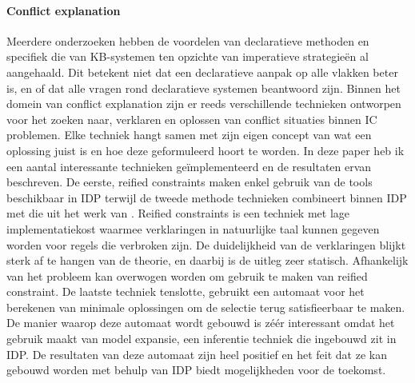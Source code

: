 \paragraph{Conflict explanation}
Meerdere onderzoeken hebben de voordelen van declaratieve methoden \cite{gelle1996interactive} en specifiek die van KB-systemen \cite{de2014predicate} \cite{denecker2008building} \cite{van2016kb} \cite{vlaeminck2009logical} ten opzichte van imperatieve strategie\"{e}n al aangehaald. Dit betekent niet dat een declaratieve aanpak op alle vlakken beter is, en of dat alle vragen rond declaratieve systemen beantwoord zijn. Binnen het domein van conflict explanation zijn er reeds verschillende technieken ontworpen voor het zoeken naar, verklaren en oplossen van conflict situaties binnen IC problemen. Elke techniek hangt samen met zijn eigen concept van wat een oplossing juist is en hoe deze geformuleerd hoort te worden. In deze paper heb ik een aantal interessante technieken ge\"{i}mplementeerd en de resultaten ervan beschreven. De eerste, reified constraints maken enkel gebruik van de tools beschikbaar in IDP terwijl de tweede methode technieken combineert binnen IDP met die uit het werk van \citep{amilhastre2002consistency}. Reified constraints is een techniek met lage implementatiekost waarmee verklaringen in natuurlijke taal kunnen gegeven worden voor regels die verbroken zijn. De duidelijkheid van de verklaringen blijkt sterk af te hangen van de theorie, en daarbij is de uitleg zeer statisch. Afhankelijk van het probleem kan overwogen worden om gebruik te maken van reified constraint. De laatste techniek tenslotte, gebruikt een automaat voor het berekenen van minimale oplossingen om de selectie terug satisfieerbaar te maken. De manier waarop deze automaat wordt gebouwd is z\'{e}\'{e}r interessant omdat het gebruik maakt van model expansie, een inferentie techniek die ingebouwd zit in IDP. De resultaten van deze automaat zijn heel positief en het feit dat ze kan gebouwd worden met behulp van IDP biedt mogelijkheden voor de toekomst. 

